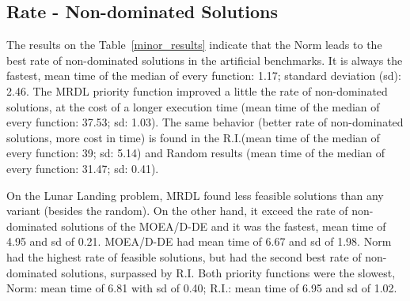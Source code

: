 \subsection{Rate - Non-dominated Solutions}

The results on the Table~\ref{minor_results} indicate that the Norm leads to the best rate of non-dominated solutions in the artificial benchmarks. It is always the fastest, mean time of the median of every function: 1.17; standard deviation (sd): 2.46. The MRDL priority function improved a little the rate of non-dominated solutions, at the cost of a longer execution time (mean time of the median of every function: 37.53; sd: 1.03). The same behavior (better rate of non-dominated solutions, more cost in time) is found in the R.I.(mean time of the median of every function: 39; sd: 5.14) and Random results (mean time of the median of every function: 31.47; sd: 0.41). 

On the Lunar Landing problem, MRDL found less feasible solutions than any variant (besides the random). On the other hand, it exceed the rate of non-dominated solutions of the MOEA/D-DE and it was the fastest, mean time of 4.95 and sd of 0.21. MOEA/D-DE had mean time of 6.67 and sd of 1.98. Norm had the highest rate of feasible solutions, but had the second best rate of non-dominated solutions, surpassed by R.I. Both priority functions were the slowest, Norm: mean time of 6.81 with sd of 0.40; R.I.: mean time of 6.95 and sd of 1.02. 











